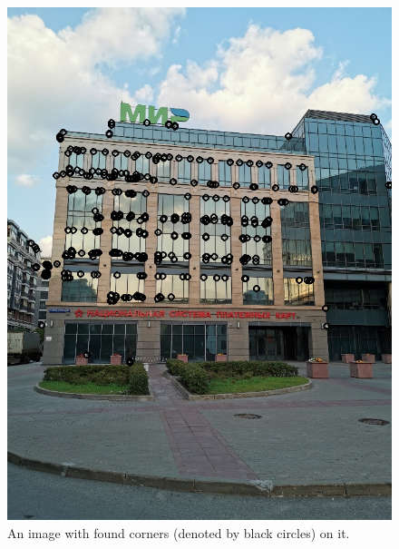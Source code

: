 \documentclass[a4paper,twoside]{article}
\begin{document}
\begin{figure}[!h]
\setlength{\lineskip}{0pt}
\vspace{-3.0cm}
  \centering
   \includegraphics[scale=0.35,natwidth=684,natheight=912]{2.jpg} 
  \caption{An image with found corners (denoted by black circles) on it.}
  \label{fig:example1}
 \end{figure} 
\end{document}
